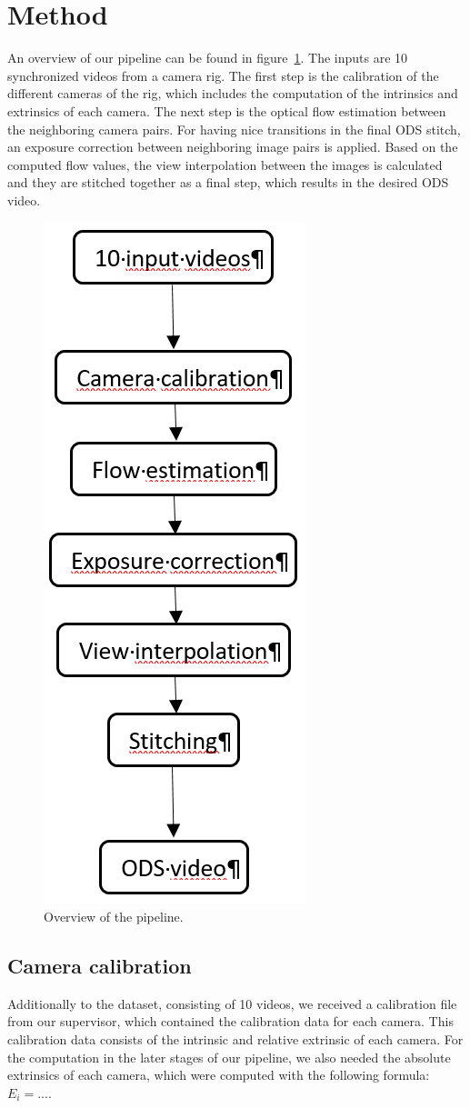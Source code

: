 \documentclass[10pt,twocolumn,letterpaper]{article}
\begin{document}
\section{Method}
An overview of our pipeline can be found in figure~\ref{pipeline}. The inputs are 10 synchronized videos from a camera rig. The first step is the calibration of the different cameras of the rig, which includes the computation of the intrinsics and extrinsics of each camera. The next step is the optical flow estimation between the neighboring camera pairs. For having nice transitions in the final ODS stitch, an exposure correction between neighboring image pairs is applied. Based on the computed flow values, the view interpolation between the images is calculated and they are stitched together as a final step, which results in the desired ODS video.

\begin{figure}[t]
\begin{center}
   \includegraphics[width=0.3\linewidth]{pictures/pipeline.png}
\end{center}
   \caption{Overview of the pipeline.}
\label{pipeline}
\end{figure}

\subsection{Camera calibration}
Additionally to the dataset, consisting of 10 videos, we received a calibration file from our supervisor, which contained the calibration data for each camera. This calibration data consists of the intrinsic and relative extrinsic of each camera. For the computation in the later stages of our pipeline, we also needed the absolute extrinsics of each camera, which were computed with the following formula:
$E_i=....$
\end{document}
